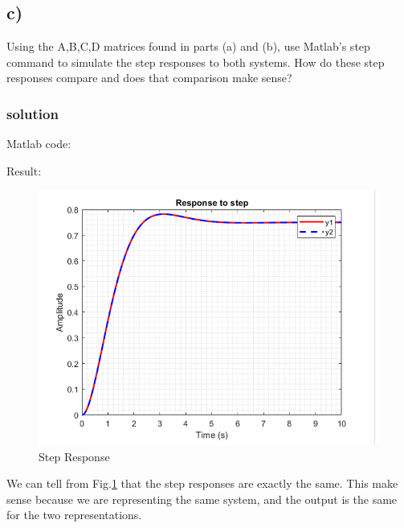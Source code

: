     \subsection{c)}
    Using the A,B,C,D matrices found in parts (a) and (b), use Matlab's step command to simulate the step responses to both systems. How do these step responses compare and does that comparison make sense? 
    \subsubsection{solution}
    Matlab code:
    
    Result:
    \begin{figure}[htp]
        \centering
        \includegraphics[width=15cm]{images/Q1_c_fig.png}
        \caption{Step Response}
        \label{fig:Q1c}
    \end{figure}

    We can tell from Fig.\ref{fig:Q1c} that the step responses are exactly the same.
    This make sense because we are representing the same system, and the output is the same for the two representations. 

\pagebreak